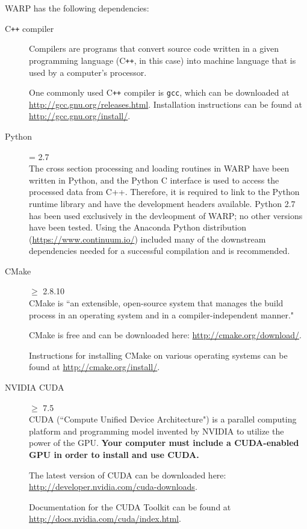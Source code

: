 \documentclass[twoside,a4paper]{refart}
\begin{document}
WARP has the following dependencies:

\begin{description}

\item[C\texttt{++} compiler]
Compilers are programs that convert source code written in a given programming language (C\texttt{++}, in 
this case) into machine language that is used by a computer's processor.

One commonly used C\texttt{++} compiler is \texttt{gcc}, which can be downloaded at 
\url{http://gcc.gnu.org/releases.html}. Installation instructions can be found at 
\url{http://gcc.gnu.org/install/}.

\item[Python] = 2.7 \\
The cross section processing and loading routines in WARP have been written in Python, and the Python C interface is used to access the processed data from C++.  Therefore, it is required to link to the Python runtime library and have the development headers available.  Python 2.7 has been used exclusively in the devleopment of WARP; no other versions have been tested.  Using the Anaconda Python distribution (\url{https://www.continuum.io/}) included many of the downstream dependencies needed for a successful compilation and is recommended.

\item[CMake]$\ge$ 2.8.10 \\
CMake is ``an extensible, open-source system that manages the build process in an operating system and in
a compiler-independent manner."

CMake is free and can be downloaded here: \url{http://cmake.org/download/}.

Instructions for installing CMake on various operating systems can be found at 
\url{http://cmake.org/install/}.
  
\item[NVIDIA CUDA]$\ge$ 7.5 \\
CUDA (``Compute Unified Device Architecture") is a parallel computing platform and programming model 
invented by NVIDIA to utilize the power of the GPU. \textbf{Your computer must include a CUDA-enabled 
GPU in order to install and use CUDA.}

The latest version of CUDA can be downloaded here: \url{http://developer.nvidia.com/cuda-downloads}.

Documentation for the CUDA Toolkit can be found at \url{http://docs.nvidia.com/cuda/index.html}.


\end{description}
\end{document}
